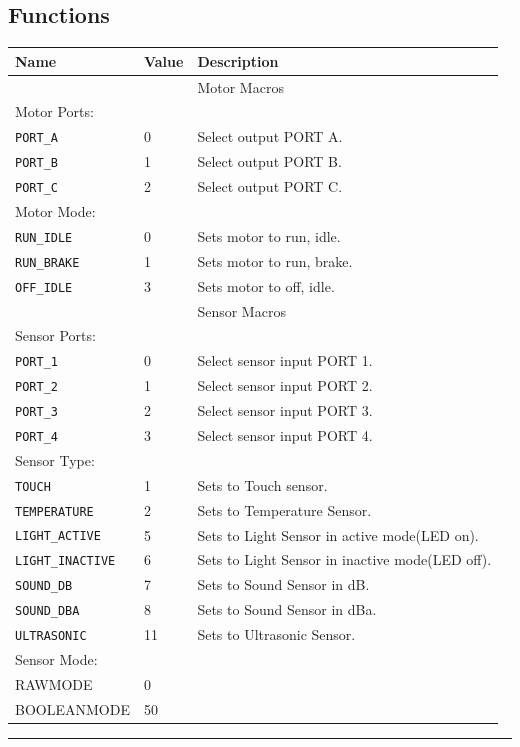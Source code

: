 \documentclass[12pt]{article}
\begin{document}
\subsection{Functions}
\begin{tabular}{ | l | l | p{10cm} |}\hline
Name 			&	Value	&	Description\\
\hline
				&			&	Motor Macros\\
\hline
Motor Ports:	&			&	\\
\hline
\verb+PORT_A+	&	0		&	Select output PORT A.\\
\verb+PORT_B+	&	1		&	Select output PORT B.\\
\verb+PORT_C+	&	2		&	Select output PORT C.\\
\hline
Motor Mode:		&			&	\\
\hline
\verb+RUN_IDLE+	&	0		&	Sets motor to run, idle.\\
\verb+RUN_BRAKE+&	1		&	Sets motor to run, brake.\\
\verb+OFF_IDLE+	&	3		&	Sets motor to off, idle.\\
\hline
				&			&	Sensor Macros\\
\hline
Sensor Ports:	&			&	\\
\hline
\verb+PORT_1+	&	0		&	Select sensor input PORT 1.\\
\verb+PORT_2+	&	1		&	Select sensor input PORT 2.\\
\verb+PORT_3+	&	2		&	Select sensor input PORT 3.\\
\verb+PORT_4+	&	3		&	Select sensor input PORT 4.\\
\hline
Sensor Type:	&			&	\\
\hline
\verb+TOUCH+		&	1	&	Sets to Touch sensor.\\
\verb+TEMPERATURE+	&	2	&	Sets to Temperature Sensor.\\
\verb+LIGHT_ACTIVE+	&	5	&	Sets to Light Sensor in active mode(LED on).\\
\verb+LIGHT_INACTIVE+ &	6	&	Sets to Light Sensor in inactive mode(LED off).\\
\verb+SOUND_DB+		&	7	&	Sets to Sound Sensor in dB.\\
\verb+SOUND_DBA+	&	8	&	Sets to Sound Sensor in dBa.\\
\verb+ULTRASONIC+	&	11	&	Sets to Ultrasonic Sensor.\\
\hline
Sensor Mode:	&			&	\\
\hline
RAWMODE			&	0		&	\\	 
BOOLEANMODE		&	50	 	&	\\
\hline
\end{tabular}
\hrule
\newpage
\end{document}
